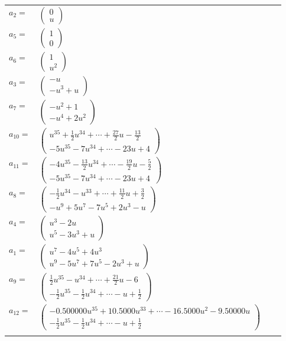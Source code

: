 \documentclass[1p]{elsarticle_modified}
\theoremstyle{definition}
\begin{document}
\begin{tabular}{m{7pt} m{180pt} m{7pt} m{180pt} }
\flushright $a_{2}=$&$\begin{pmatrix}0\\u\end{pmatrix}$ \\
\flushright $a_{5}=$&$\begin{pmatrix}1\\0\end{pmatrix}$ \\
\flushright $a_{6}=$&$\begin{pmatrix}1\\u^2\end{pmatrix}$ \\
\flushright $a_{3}=$&$\begin{pmatrix}- u\\- u^3+u\end{pmatrix}$ \\
\flushright $a_{7}=$&$\begin{pmatrix}- u^2+1\\- u^4+2 u^2\end{pmatrix}$ \\
\flushright $a_{10}=$&$\begin{pmatrix}u^{35}+\frac{1}{2} u^{34}+\cdots+\frac{27}{2} u-\frac{13}{2}\\-5 u^{35}-7 u^{34}+\cdots-23 u+4\end{pmatrix}$ \\
\flushright $a_{11}=$&$\begin{pmatrix}-4 u^{35}-\frac{13}{2} u^{34}+\cdots-\frac{19}{2} u-\frac{5}{2}\\-5 u^{35}-7 u^{34}+\cdots-23 u+4\end{pmatrix}$ \\
\flushright $a_{8}=$&$\begin{pmatrix}-\frac{1}{2} u^{34}- u^{33}+\cdots+\frac{11}{2} u+\frac{3}{2}\\- u^9+5 u^7-7 u^5+2 u^3- u\end{pmatrix}$ \\
\flushright $a_{4}=$&$\begin{pmatrix}u^3-2 u\\u^5-3 u^3+u\end{pmatrix}$ \\
\flushright $a_{1}=$&$\begin{pmatrix}u^7-4 u^5+4 u^3\\u^9-5 u^7+7 u^5-2 u^3+u\end{pmatrix}$ \\
\flushright $a_{9}=$&$\begin{pmatrix}\frac{1}{2} u^{35}- u^{34}+\cdots+\frac{21}{2} u-6\\-\frac{1}{2} u^{35}-\frac{1}{2} u^{34}+\cdots- u+\frac{1}{2}\end{pmatrix}$ \\
\flushright $a_{12}=$&$\begin{pmatrix}-0.500000 u^{35}+10.5000 u^{33}+\cdots-16.5000 u^{2}-9.50000 u\\-\frac{1}{2} u^{35}-\frac{1}{2} u^{34}+\cdots- u+\frac{1}{2}\end{pmatrix}$\\&\end{tabular}
\end{document}

